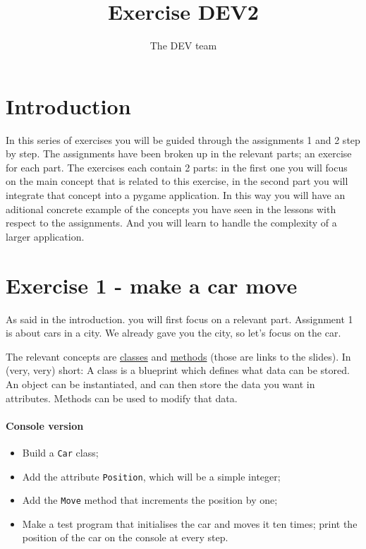 \documentclass[12pt,a4paper]{article}
\author{The DEV team}
\title{Exercise DEV2}
\begin{document}
	\maketitle

	\section{Introduction}
	    In this series of exercises you will be guided through the assignments 1 and 2 step by step.
	    The assignments have been broken up in the relevant parts; an exercise for each part.
	    The exercises each contain 2 parts: in the first one you will focus on the main concept that is related to this exercise, in the second part you will integrate that concept into a pygame application.
	    In this way you will have an aditional concrete example of the concepts you have seen in the lessons with respect to the assignments.
	    And you will learn to handle the complexity of a larger application.



	\section{Exercise 1 - make a car move}
        As said in the introduction. you will first focus on a relevant part.
        Assignment 1 is about cars in a city.
        We already gave you the city, so let's focus on the car.

        The relevant concepts are \href{https://github.com/hogeschool/INFDEV02-2/raw/master/Slides/Lecture%20I%20-%20data%20structures.pdf}{classes} and \href{https://github.com/hogeschool/INFDEV02-2/raw/master/Slides/Lecture%20V%20-%20methods.pdf}{methods} (those are links to the slides).
        In (very, very) short: A class is a blueprint which defines what data can be stored.
        An object can be instantiated, and can then store the data you want in attributes.
        Methods can be used to modify that data.

        \paragraph*{Console version}
			\begin{itemize}
				\item Build a \texttt{Car} class;
				\item Add the attribute \texttt{Position}, which will be a simple integer;
				\item Add the \texttt{Move} method that increments the position by one;
				\item Make a test program that initialises the car and moves it ten times; print the position of the car on the console at every step.
			\end{itemize}
\end{document}
